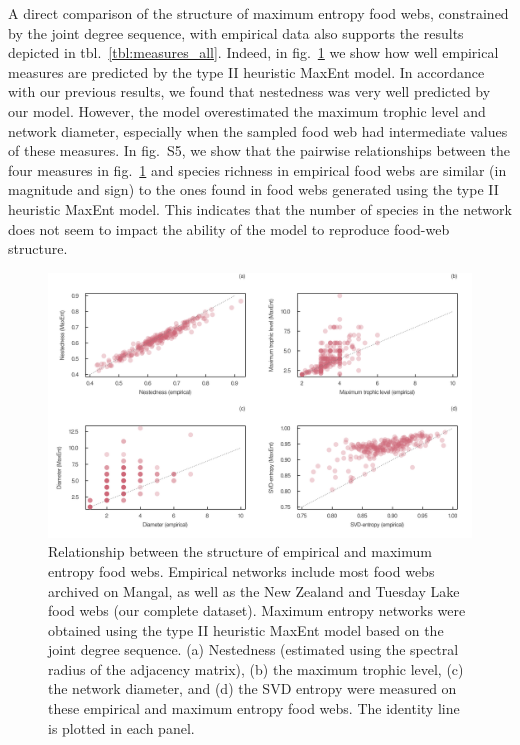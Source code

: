 \documentclass[11pt]{article}
\makeatletter
\def\maxwidth{\ifdim\Gin@nat@width>\linewidth\linewidth
\else\Gin@nat@width\fi}
\let\Oldincludegraphics\includegraphics
\renewcommand{\includegraphics}[1]{\Oldincludegraphics[width=\maxwidth]{#1}}
\makeatother
\begin{document}
A direct comparison of the structure of maximum entropy food webs,
constrained by the joint degree sequence, with empirical data also
supports the results depicted in tbl.~\ref{tbl:measures_all}. Indeed, in
fig.~\ref{fig:measures} we show how well empirical measures are
predicted by the type II heuristic MaxEnt model. In accordance with our
previous results, we found that nestedness was very well predicted by
our model. However, the model overestimated the maximum trophic level
and network diameter, especially when the sampled food web had
intermediate values of these measures. In fig.~S5, we show that the
pairwise relationships between the four measures in
fig.~\ref{fig:measures} and species richness in empirical food webs are
similar (in magnitude and sign) to the ones found in food webs generated
using the type II heuristic MaxEnt model. This indicates that the number
of species in the network does not seem to impact the ability of the
model to reproduce food-web structure.

\begin{figure}
\hypertarget{fig:measures}{%
\centering
\includegraphics{figures/measures_emp_maxent.png}
\caption{Relationship between the structure of empirical and maximum
entropy food webs. Empirical networks include most food webs archived on
Mangal, as well as the New Zealand and Tuesday Lake food webs (our
complete dataset). Maximum entropy networks were obtained using the type
II heuristic MaxEnt model based on the joint degree sequence. (a)
Nestedness (estimated using the spectral radius of the adjacency
matrix), (b) the maximum trophic level, (c) the network diameter, and
(d) the SVD entropy were measured on these empirical and maximum entropy
food webs. The identity line is plotted in each
panel.}\label{fig:measures}
}
\end{figure}
\end{document}
